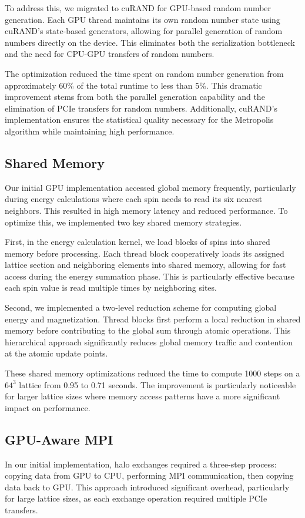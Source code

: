 \documentclass{article}
\begin{document}
To address this, we migrated to cuRAND for GPU-based random number generation. Each GPU thread maintains its own random number state using cuRAND's state-based generators, allowing for parallel generation of random numbers directly on the device. This eliminates both the serialization bottleneck and the need for CPU-GPU transfers of random numbers.

The optimization reduced the time spent on random number generation from approximately 60\% of the total runtime to less than 5\%. This dramatic improvement stems from both the parallel generation capability and the elimination of PCIe transfers for random numbers. Additionally, cuRAND's implementation ensures the statistical quality necessary for the Metropolis algorithm while maintaining high performance.

\subsection{Shared Memory}
Our initial GPU implementation accessed global memory frequently, particularly during energy calculations where each spin needs to read its six nearest neighbors. This resulted in high memory latency and reduced performance. To optimize this, we implemented two key shared memory strategies.

First, in the energy calculation kernel, we load blocks of spins into shared memory before processing. Each thread block cooperatively loads its assigned lattice section and neighboring elements into shared memory, allowing for fast access during the energy summation phase. This is particularly effective because each spin value is read multiple times by neighboring sites.

Second, we implemented a two-level reduction scheme for computing global energy and magnetization. Thread blocks first perform a local reduction in shared memory before contributing to the global sum through atomic operations. This hierarchical approach significantly reduces global memory traffic and contention at the atomic update points.

These shared memory optimizations reduced the time to compute 1000 steps on a $64^3$ lattice from 0.95 to 0.71 seconds. The improvement is particularly noticeable for larger lattice sizes where memory access patterns have a more significant impact on performance.

\subsection{GPU-Aware MPI}
In our initial implementation, halo exchanges required a three-step process: copying data from GPU to CPU, performing MPI communication, then copying data back to GPU. This approach introduced significant overhead, particularly for large lattice sizes, as each exchange operation required multiple PCIe transfers.
\end{document}
